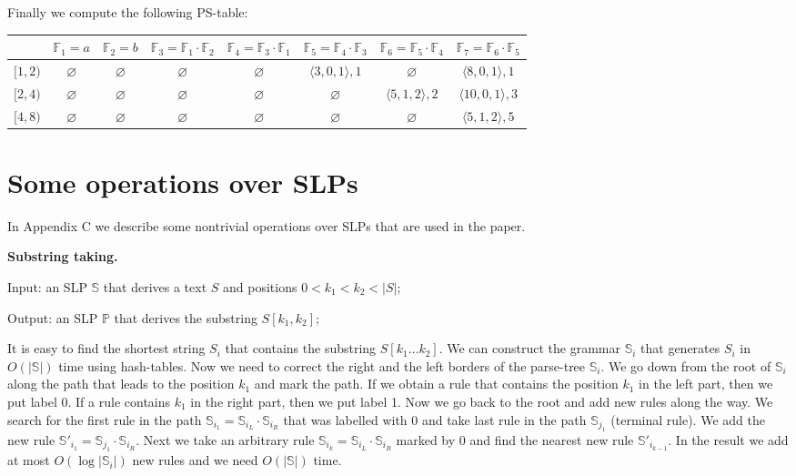 \documentclass[11pt]{article}
\begin{document}
\begin{appendix}
Finally we compute the following PS-table:

{\footnotesize\noindent
\begin{tabular}{|c|c|c|c|c|c|c|c|} \hline

 & $\mathbb{F}_1 = a$ & $\mathbb{F}_2 = b$ & $\mathbb{F}_3 = \mathbb{F}_1 \cdot \mathbb{F}_2$ & $\mathbb{F}_4 =
 \mathbb{F}_3 \cdot \mathbb{F}_1$ & $\mathbb{F}_5 = \mathbb{F}_4 \cdot \mathbb{F}_3$ & $\mathbb{F}_6 = \mathbb{F}_5
 \cdot \mathbb{F}_4$ & $\mathbb{F}_7 = \mathbb{F}_6 \cdot \mathbb{F}_5$ \\ \hline

 $[1, 2)$ & $\varnothing$ & $\varnothing$ & $\varnothing$ & $\varnothing$ & $\langle3, 0, 1\rangle, 1$ & $\varnothing$ & $\langle8, 0, 1\rangle, 1$\\ \hline

 $[2, 4)$ & $\varnothing$ & $\varnothing$ & $\varnothing$ & $\varnothing$ & $\varnothing$ & $\langle5, 1, 2\rangle, 2$ & $\langle10, 0, 1\rangle, 3$ \\ \hline

 $[4, 8)$ & $\varnothing$ & $\varnothing$ & $\varnothing$ & $\varnothing$ & $\varnothing$ & $\varnothing$ & $\langle5, 1, 2\rangle, 5$\\ \hline
\end{tabular}
}

\section{Some operations over SLPs}

In Appendix C we describe some nontrivial operations over SLPs
that are used in the paper.

\medskip

{\bf Substring taking.}

{\sc Input:} an SLP $\mathbb{S}$ that derives a text $S$ and positions $0 < k_1 < k_2 < |S|$;

{\sc Output:} an SLP $\mathbb{P}$ that derives the substring $S[k_1, k_2]$;

It is easy to find the shortest string $S_i$ that contains the
substring $S[k_1\dots k_2]$. We can construct the grammar
$\mathbb{S}_i$ that generates $S_i$ in $O(|\mathbb{S}|)$ time
using hash-tables. Now we need to correct the right and the left
borders of the parse-tree $\mathbb{S}_i$. We go down from the root
of $\mathbb{S}_i$ along the path that leads to the position $k_1$
and mark the path. If we obtain a rule that contains the position
$k_1$ in the left part, then we put label 0. If a rule contains
$k_1$ in the right part, then we put label 1. Now we go back to
the root and add new rules along the way. We search for the first
rule in the path $\mathbb{S}_{i_1} = \mathbb{S}_{i_L}\cdot
\mathbb{S}_{i_R}$ that was labelled with 0 and take last rule in
the path $\mathbb{S}_{j_1}$ (terminal rule). We add the new rule
$\mathbb{S}'_{i_1} = \mathbb{S}_{j_1}\cdot \mathbb{S}_{i_R}$. Next
we take an arbitrary rule $\mathbb{S}_{i_k} =
\mathbb{S}_{i_L}\cdot \mathbb{S}_{i_R}$ marked by 0 and find the
nearest new rule $\mathbb{S}'_{i_{k-1}}$. In the result we add at
most $O(\log |\mathbb{S}_i|)$ new rules and we need
$O(|\mathbb{S}|)$ time.


\end{appendix}
\end{document}
